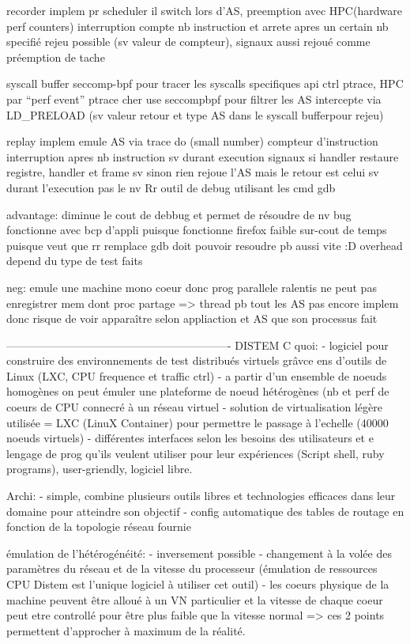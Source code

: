 recorder implem
pr scheduler il switch lors d'AS, preemption avec HPC(hardware perf counters) interruption compte nb instruction et arrete apres un certain nb specifié rejeu possible (sv valeur de compteur), signaux aussi rejoué comme préemption de tache

syscall buffer
seccomp-bpf pour tracer les syscalls specifiques
api ctrl ptrace, HPC par ``perf event''
ptrace cher use seccompbpf pour filtrer les AS intercepte via LD\_PRELOAD (sv valeur retour et type AS dans le syscall bufferpour rejeu)

replay implem
emule AS via trace do (small number)
compteur d'instruction interruption apres nb instruction sv durant execution
signaux si handler  restaure registre, handler et frame sv sinon rien
rejoue l'AS mais le retour est celui sv durant l'execution pas le nv
Rr outil de debug utilisant les cmd gdb

advantage:
diminue le cout de debbug et permet de résoudre de nv bug
fonctionne avec bcp d'appli puisque fonctionne firefox
faible sur-cout de temps puisque veut que rr remplace gdb doit pouvoir resoudre pb aussi vite :D overhead depend du type de test faits

neg:
emule une machine mono coeur donc prog parallele ralentis
ne peut pas enregistrer mem dont proc partage => thread pb
tout les AS pas encore implem donc risque de voir apparaître selon appliaction et AS que son processus fait


-------------------------------------------------------------
DISTEM
C quoi:
- logiciel pour construire des environnements de test distribués virtuels grâvce ens d'outils de Linux (LXC, CPU frequence et traffic ctrl)
- a partir d'un ensemble de noeuds homogènes on peut émuler une plateforme de noeud hétérogènes (nb et perf de coeurs de CPU connecré à un réseau virtuel
- solution de virtualisation légère utilisée = LXC (LinuX Container) pour permettre le passage à l'echelle (40000 noeuds virtuels)
- différentes interfaces selon les besoins des utilisateurs et e lengage de prog qu'ils veulent utiliser pour leur expériences (Script shell, ruby programs), user-griendly, logiciel libre.

Archi:
- simple, combine plusieurs outils libres et technologies efficaces dans leur domaine pour atteindre son objectif
- config automatique des tables de routage en fonction de la topologie réseau fournie

émulation de l'hétérogénéité:
- inversement possible
- changement à la volée des paramètres du réseau et de la vitesse du processeur (émulation de ressources CPU Distem est l'unique logiciel à utiliser cet outil)
- les coeurs physique de la machine peuvent  être alloué à un VN particulier et la vitesse de chaque coeur peut etre controllé pour être plus faible que la vitesse normal
=> ces 2 points permettent d'approcher à maximum de la réalité.

